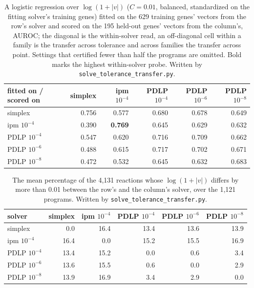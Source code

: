 \begin{table}[H]
  \centering
  \footnotesize
  \caption[The probe across tolerances]{A logistic regression over $\log(1 + |v|)$ ($C = 0.01$, balanced, standardized on the fitting solver's training genes) fitted on the 629 training genes' vectors from the row's solver and scored on the 195 held-out genes' vectors from the column's, AUROC; the diagonal is the within-solver read, an off-diagonal cell within a family is the transfer across tolerance and across families the transfer across point. Settings that certified fewer than half the programs are omitted. Bold marks the highest within-solver probe. Written by \texttt{solve\_tolerance\_transfer.py}.}
  \label{tab:solve-tolerance-transfer}
  \begin{tabular}{@{}lrrrrr@{}}
    \hline
    fitted on / scored on & simplex & ipm $10^{-4}$ & PDLP $10^{-4}$ & PDLP $10^{-6}$ & PDLP $10^{-8}$ \\
    \hline
    simplex & 0.756 & 0.577 & 0.680 & 0.678 & 0.649 \\
    ipm $10^{-4}$ & 0.390 & \textbf{0.769} & 0.645 & 0.629 & 0.632 \\
    PDLP $10^{-4}$ & 0.547 & 0.620 & 0.716 & 0.709 & 0.662 \\
    PDLP $10^{-6}$ & 0.488 & 0.615 & 0.717 & 0.702 & 0.671 \\
    PDLP $10^{-8}$ & 0.472 & 0.532 & 0.645 & 0.632 & 0.683 \\
    \hline
  \end{tabular}
\end{table}

\begin{table}[H]
  \centering
  \footnotesize
  \caption[The vectors across tolerances]{The mean percentage of the 4,131 reactions whose $\log(1 + |v|)$ differs by more than 0.01 between the row's and the column's solver, over the 1,121 programs. Written by \texttt{solve\_tolerance\_transfer.py}.}
  \label{tab:solve-tolerance-transfer-moved}
  \begin{tabular}{@{}lrrrrr@{}}
    \hline
    solver & simplex & ipm $10^{-4}$ & PDLP $10^{-4}$ & PDLP $10^{-6}$ & PDLP $10^{-8}$ \\
    \hline
    simplex & 0.0 & 16.4 & 13.4 & 13.6 & 13.9 \\
    ipm $10^{-4}$ & 16.4 & 0.0 & 15.2 & 15.5 & 16.9 \\
    PDLP $10^{-4}$ & 13.4 & 15.2 & 0.0 & 0.6 & 3.4 \\
    PDLP $10^{-6}$ & 13.6 & 15.5 & 0.6 & 0.0 & 2.9 \\
    PDLP $10^{-8}$ & 13.9 & 16.9 & 3.4 & 2.9 & 0.0 \\
    \hline
  \end{tabular}
\end{table}
